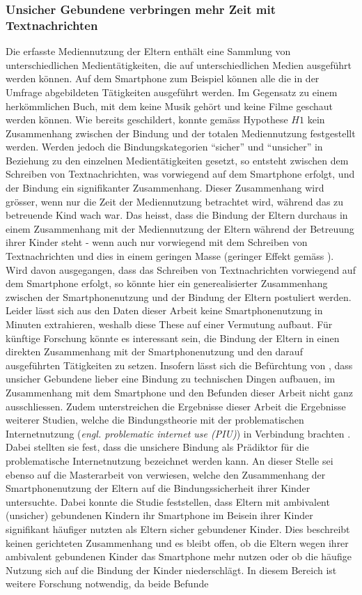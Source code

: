 \subsubsection{Unsicher Gebundene verbringen mehr Zeit mit Textnachrichten}
Die erfasste Mediennutzung der Eltern enthält eine Sammlung von unterschiedlichen Medientätigkeiten, die auf unterschiedlichen Medien ausgeführt werden können. Auf dem Smartphone zum Beispiel können alle die in der Umfrage abgebildeten Tätigkeiten ausgeführt werden. Im Gegensatz zu einem herkömmlichen Buch, mit dem keine Musik gehört und keine Filme geschaut werden können. Wie bereits geschildert, konnte gemäss Hypothese $H1$ kein Zusammenhang zwischen der Bindung und der totalen Mediennutzung festgestellt werden. Werden jedoch die Bindungskategorien \enquote{sicher} und \enquote{unsicher} in Beziehung zu den einzelnen Medientätigkeiten gesetzt, so entsteht zwischen dem Schreiben von Textnachrichten, was vorwiegend auf dem Smartphone erfolgt, und der Bindung ein signifikanter Zusammenhang. Dieser Zusammen\-hang wird grösser, wenn nur die Zeit der Mediennutzung betrachtet wird, während das zu betreuende Kind wach war. Das heisst, dass die Bindung der Eltern durchaus in einem Zusammen\-hang mit der Mediennutzung der Eltern während der Betreuung ihrer Kinder steht - wenn auch nur vorwiegend mit dem Schreiben von Textnachrichten und dies in einem geringen Masse (geringer Effekt gemäss ). Wird davon ausgegangen, dass das Schreiben von Textnachrichten vorwiegend auf dem Smartphone erfolgt, so könnte hier ein generealisierter Zusammenhang zwischen der Smartphonenutzung und der Bindung der Eltern postuliert werden. Leider lässt sich aus den Daten dieser Arbeit keine Smartphonenutzung in Minuten extrahieren, weshalb diese These auf einer Vermutung aufbaut. Für künftige Forschung könnte es interessant sein, die Bindung der Eltern in einen direkten Zusammen\-hang mit der Smartphonenutzung und den darauf ausgeführten Tätigkeiten zu setzen. Insofern lässt sich die Befürchtung von , dass unsicher Gebundene lieber eine Bindung zu technischen Dingen aufbauen, im Zusammenhang mit dem Smartphone und den Befunden dieser Arbeit nicht ganz ausschliessen. Zudem unterstreichen die Ergebnisse dieser Arbeit die Ergebnisse weiterer Studien, welche die Bindungstheorie mit der problematischen Internet\-nutzung (\textit{engl. problematic internet use (PIU)}) in Verbindung brachten \nohyphens{\cite{Jia2016, Chang2015, Lin2011}}. Dabei stellten sie fest, dass die unsichere Bindung als Prädiktor für die problematische Internetnutzung bezeichnet werden kann. An dieser Stelle sei ebenso auf die Masterarbeit von  verwiesen, welche den Zusammenhang der Smartphonenutzung der Eltern auf die Bindungssicherheit ihrer Kinder untersuchte. Dabei konnte die Studie feststellen, dass Eltern mit ambivalent (unsicher) gebundenen Kindern ihr Smartphone im Beisein ihrer Kinder signifikant häufiger nutzten als Eltern sicher gebundener Kinder. Dies beschreibt keinen gerichteten Zusammenhang und es bleibt offen, ob die Eltern wegen ihrer ambivalent gebundenen Kinder das Smartphone mehr nutzen oder ob die häufige Nutzung sich auf die Bindung der Kinder niederschlägt. In diesem Bereich ist weitere Forschung notwendig, da beide Befunde 